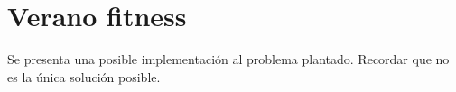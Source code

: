 \section{Verano fitness}


Se presenta una posible implementación al problema plantado. Recordar que no es la única solución posible.



